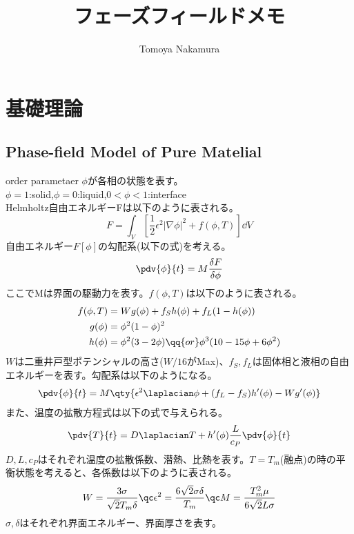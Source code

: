 \documentclass[twocolumn,landscape]{ltjsarticle}
\author{Tomoya Nakamura}
\begin{document}
\title{フェーズフィールドメモ}
\maketitle

\section{基礎理論}
\subsection{Phase-field Model of Pure Matelial}
order parametaer $\phi$が各相の状態を表す。\\
$\phi=1$:solid,$\phi=0$:liquid,$0<\phi<1$:interface\\
Helmholtz自由エネルギーFは以下のように表される。
\begin{equation}
  F=\int_V\left[\frac{1}{2}\epsilon^2|\nabla\phi|^2+f(\phi,T)\right]\dd{V}
\end{equation}
自由エネルギー$F[\phi]$の勾配系(以下の式)を考える。
\begin{equation}
  \pdv{\phi}{t}=M\frac{\delta F}{\delta \phi}
\end{equation}
ここでMは界面の駆動力を表す。$f(\phi,T)$は以下のように表される。
\begin{equation}
  \begin{split}
    f(\phi,T) & =W g(\phi)+f_S h(\phi)+f_L(1-h(\phi))             \\
    g(\phi)   & =\phi^2(1-\phi)^2                                 \\
    h(\phi)   & =\phi^2(3-2\phi)\qq{or}\phi^3(10-15\phi+6\phi^2)
  \end{split}
\end{equation}
$W$は二重井戸型ポテンシャルの高さ($W/16$がMax)、$f_S,f_L$は固体相と液相の自由エネルギーを表す。勾配系は以下のようになる。
\begin{equation}
  \begin{split}
    \pdv{\phi}{t} & =M\qty{\epsilon^2\laplacian\phi+(f_L-f_S)h'(\phi)-Wg'(\phi)} \\
  \end{split}
\end{equation}
また、温度の拡散方程式は以下の式で与えられる。
\begin{equation}
  \pdv{T}{t}=D\laplacian T+h'(\phi)\frac{L}{c_P}\pdv{\phi}{t}
\end{equation}
$D,L,c_P$はそれぞれ温度の拡散係数、潜熱、比熱を表す。$T=T_m$(融点)の時の平衡状態を考えると、各係数は以下のように表される。
\begin{equation}
  W=\frac{3\sigma}{\sqrt{2}T_m\delta}\qc \epsilon^2=\frac{6\sqrt{2}\sigma\delta}{T_m}\qc M=\frac{T_m^2\mu}{6\sqrt{2}L\sigma}
\end{equation}
$\sigma,\delta$はそれぞれ界面エネルギー、界面厚さを表す。
\end{document}
